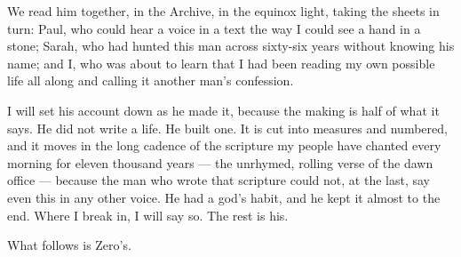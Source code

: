 
We read him together, in the Archive, in the equinox light, taking the sheets in turn: Paul, who could hear a voice in a text the way I could see a hand in a stone; Sarah, who had hunted this man across sixty-six years without knowing his name; and I, who was about to learn that I had been reading my own possible life all along and calling it another man's confession.\par

I will set his account down as he made it, because the making is half of what it says. He did not write a life. He built one. It is cut into measures and numbered, and it moves in the long cadence of the scripture my people have chanted every morning for eleven thousand years --- the unrhymed, rolling verse of the dawn office --- because the man who wrote that scripture could not, at the last, say even this in any other voice. He had a god's habit, and he kept it almost to the end. Where I break in, I will say so. The rest is his.\par

What follows is Zero's.\par

\ornament

